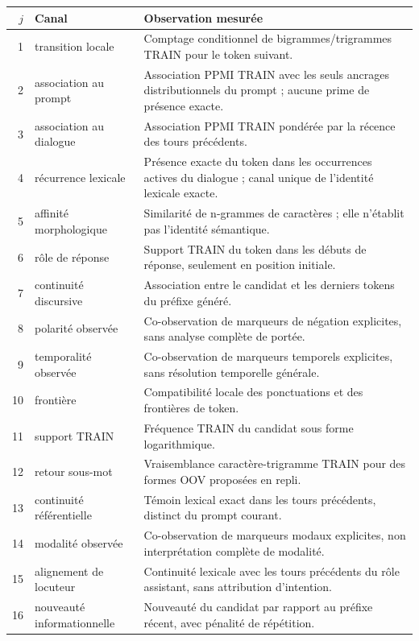 \documentclass[11pt,a4paper]{report}
\begin{document}
\begin{longtable}{r p{} p{}}
\toprule
$j$ & Canal & Observation mesurée \\
\midrule
1 & transition locale & Comptage conditionnel de bigrammes/trigrammes TRAIN pour le token suivant.\\
2 & association au prompt & Association PPMI TRAIN avec les seuls ancrages distributionnels du prompt ; aucune prime de présence exacte.\\
3 & association au dialogue & Association PPMI TRAIN pondérée par la récence des tours précédents.\\
4 & récurrence lexicale & Présence exacte du token dans les occurrences actives du dialogue ; canal unique de l’identité lexicale exacte.\\
5 & affinité morphologique & Similarité de n-grammes de caractères ; elle n'établit pas l'identité sémantique.\\
6 & rôle de réponse & Support TRAIN du token dans les débuts de réponse, seulement en position initiale.\\
7 & continuité discursive & Association entre le candidat et les derniers tokens du préfixe généré.\\
8 & polarité observée & Co-observation de marqueurs de négation explicites, sans analyse complète de portée.\\
9 & temporalité observée & Co-observation de marqueurs temporels explicites, sans résolution temporelle générale.\\
10 & frontière & Compatibilité locale des ponctuations et des frontières de token.\\
11 & support TRAIN & Fréquence TRAIN du candidat sous forme logarithmique.\\
12 & retour sous-mot & Vraisemblance caractère-trigramme TRAIN pour des formes OOV proposées en repli.\\
13 & continuité référentielle & Témoin lexical exact dans les tours précédents, distinct du prompt courant.\\
14 & modalité observée & Co-observation de marqueurs modaux explicites, non interprétation complète de modalité.\\
15 & alignement de locuteur & Continuité lexicale avec les tours précédents du rôle assistant, sans attribution d'intention.\\
16 & nouveauté informationnelle & Nouveauté du candidat par rapport au préfixe récent, avec pénalité de répétition.\\
\bottomrule
\end{longtable}
\end{document}
